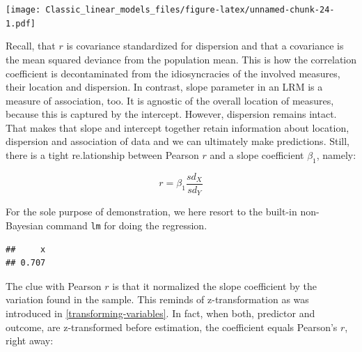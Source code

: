 \documentclass[]{svmono}
\newenvironment{Shaded}{\begin{snugshade}}{\end{snugshade}}
\newcommand{\KeywordTok}[1]{\textcolor[rgb]{0.13,0.29,0.53}{\textbf{#1}}}
\newcommand{\DecValTok}[1]{\textcolor[rgb]{0.00,0.00,0.81}{#1}}
\newcommand{\StringTok}[1]{\textcolor[rgb]{0.31,0.60,0.02}{#1}}
\newcommand{\OperatorTok}[1]{\textcolor[rgb]{0.81,0.36,0.00}{\textbf{#1}}}
\newcommand{\NormalTok}[1]{#1}
\theoremstyle{definition}
\theoremstyle{definition}
\theoremstyle{definition}
\theoremstyle{remark}
\begin{document}
\texttt{[image: Classic\_linear\_models\_files/figure-latex/unnamed-chunk-24-1.pdf]}

Recall, that \(r\) is covariance standardized for dispersion and that a
covariance is the mean squared deviance from the population mean. This
is how the correlation coefficient is decontaminated from the
idiosyncracies of the involved measures, their location and dispersion.
In contrast, slope parameter in an LRM is a measure of association, too.
It is agnostic of the overall location of measures, because this is
captured by the intercept. However, dispersion remains intact. That
makes that slope and intercept together retain information about
location, dispersion and association of data and we can ultimately make
predictions. Still, there is a tight re.lationship between Pearson \(r\)
and a slope coefficient \(\beta_1\), namely:

\[
r = \beta_1 \frac{sd_X}{sd_Y}
\]

For the sole purpose of demonstration, we here resort to the built-in
non-Bayesian command \texttt{lm} for doing the regression.

\begin{Shaded}
\end{Shaded}

\begin{verbatim}
##     x 
## 0.707
\end{verbatim}

The clue with Pearson \(r\) is that it normalized the slope coefficient
by the variation found in the sample. This reminds of z-transformation
as was introduced in \ref{transforming-variables}. In fact, when both,
predictor and outcome, are z-transformed before estimation, the
coefficient equals Pearson's \(r\), right away:
\end{document}

